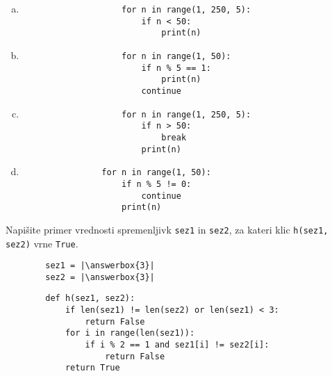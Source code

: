 \documentclass[arhiv, 10pt]{../izpit}
\newcommand{\inlinepy}[1]{\texttt{#1}}
\newcommand{\answerbox}[1]{\framebox{\vphantom{\large M}\hspace{#1cm}}}
\begin{document}
        \begin{multicols}{2}
        \begin{enumerate}[(a)]
\item 
                \begin{verbatim}
                    for n in range(1, 250, 5):
                        if n < 50:
                            print(n)
                \end{verbatim}
            
\item 
                \begin{verbatim}
                    for n in range(1, 50):
                        if n % 5 == 1:
                            print(n)
                        continue
                \end{verbatim}
            
\item 
                \begin{verbatim}
                    for n in range(1, 250, 5):
                        if n > 50:
                            break
                        print(n)
                \end{verbatim}
            
\item 
            \begin{verbatim}
                for n in range(1, 50):
                    if n % 5 != 0:
                        continue
                    print(n)
            \end{verbatim}
        
\end{enumerate}

        \end{multicols}
    
        \naloga*
        \begin{multicols}{2}
        \noindent
        Napišite primer vrednosti spremenljivk \inlinepy{sez1} in \inlinepy{sez2}, za kateri klic \inlinepy{h(sez1, sez2)} vrne \inlinepy{True}.
        \begin{verbatim}
        sez1 = |\answerbox{3}|
        sez2 = |\answerbox{3}|
        \end{verbatim}
        \vfil
        \columnbreak
        \begin{verbatim}
        def h(sez1, sez2):
            if len(sez1) != len(sez2) or len(sez1) < 3:
                return False
            for i in range(len(sez1)):
                if i % 2 == 1 and sez1[i] != sez2[i]:
                    return False
            return True
        \end{verbatim}
        \end{multicols}
    
\end{document}
